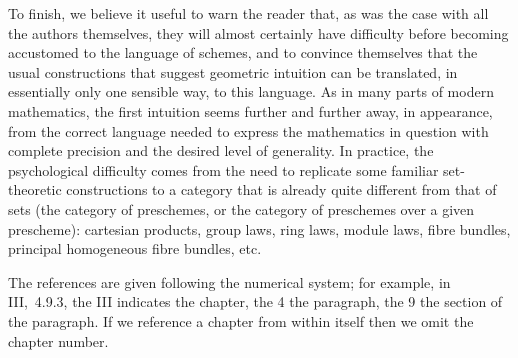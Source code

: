 \documentclass[../main.tex]{subfiles}
\begin{document}
\asttri

To finish, we believe it useful to warn the reader that, as was the case with all the authors themselves, they will almost certainly have difficulty before becoming accustomed to the language of schemes, and to convince themselves that the usual constructions that suggest geometric intuition can be translated, in essentially only one sensible way, to this language.
As in many parts of modern mathematics, the first intuition seems further and further away, in appearance, from the correct language needed to express the mathematics in question with complete precision and the desired level of generality.
In practice, the psychological difficulty comes from the need to replicate some familiar set-theoretic constructions to a category that is already quite different from that of sets (the category of preschemes, or the category of preschemes over a given prescheme): cartesian products, group laws, ring laws, module laws, fibre bundles, principal homogeneous fibre bundles, etc.

\asttri

The references are given following the numerical system; for example, in III,~4.9.3, the III indicates the chapter, the 4 the paragraph, the 9 the section of the paragraph.
If we reference a chapter from within itself then we omit the chapter number.
\end{document}
